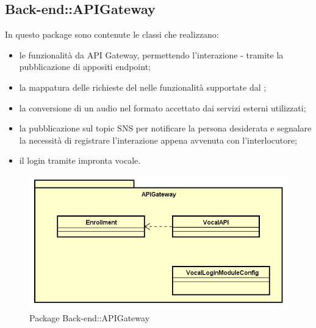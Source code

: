 \subsection{Back-end::APIGateway}
In questo package sono contenute le classi che realizzano:
\begin{itemize}
	\item le funzionalità da API Gateway, permettendo l'interazione  -  tramite la pubblicazione di appositi endpoint;
	\item la mappatura delle richieste del  nelle funzionalità supportate dal ;
	\item la conversione di un audio nel formato accettato dai servizi esterni utilizzati;
	\item la pubblicazione sul topic SNS per notificare la persona desiderata e segnalare la necessità di registrare l'interazione appena avvenuta con l'interlocutore;
	\item il login tramite impronta vocale.
\end{itemize}
\begin{figure}[h] \centering \includegraphics[width=\textwidth,height=\textheight,keepaspectratio]{images/diagrams/back-end/Official_Backend_0304/APIGateway.png}
	\caption{Package Back-end::APIGateway}
\end{figure}
\newpage




